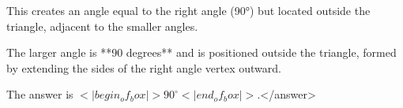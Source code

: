 This creates an angle equal to the right angle (90°) but located outside the triangle, adjacent to the smaller angles.  

The larger angle is **90 degrees** and is positioned outside the triangle, formed by extending the sides of the right angle vertex outward.  

The answer is \(<|begin_of_box|>90^\circ<|end_of_box|>\).</answer>